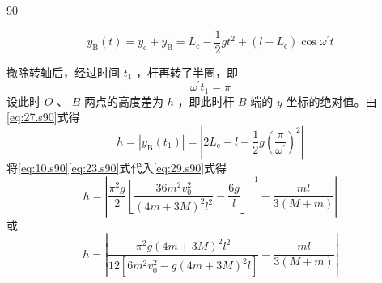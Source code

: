\begin{solution}{90}
\begin{subsolution}
\begin{equation}
\label{eq:26.s90}
\end{equation}
\begin{equation}
y _ {\mathrm{B}} (t) = y _ {\mathrm{c}} + y _ {\mathrm{B}} ^ {\prime} = L _ {\mathrm{c}} - \frac {1}{2} g t ^ {2} + \left(l - L _ {\mathrm{c}}\right) \cos \omega^ {\prime} t
\label{eq:27.s90}
\end{equation}
\end{subsolution}
\begin{subsolution}
撤除转轴后，经过时间 $t_{1}$ ，杆再转了半圈，即
\begin{equation}
\omega^ {\prime} t _ {1} = \pi
\label{eq:28.s90}
\end{equation}
设此时 $O$ 、 $B$ 两点的高度差为 $h$ ，即此时杆 $B$ 端的 $y$ 坐标的绝对值。由\eqref{eq:27.s90}式得
\begin{equation}
h = \left| y _ {\mathrm{B}} \left(t _ {1}\right) \right| = \left| 2 L _ {\mathrm{c}} - l - \frac {1}{2} g \left(\frac {\pi}{\omega^ {\prime}}\right) ^ {2} \right|
\label{eq:29.s90}
\end{equation}
将\eqref{eq:10.s90}\eqref{eq:23.s90}式代入\eqref{eq:29.s90}式得
\begin{equation}
h = \left| \frac {\pi^ {2} g}{2} \left[ \frac {3 6 m ^ {2} v _ {0} ^ {2}}{(4 m + 3 M) ^ {2} l ^ {2}} - \frac {6 g}{l} \right] ^ {- 1} - \frac {m l}{3 (M + m)} \right|
\label{eq:30.s90}
\end{equation}
或
\begin{equation}
h = \left| \frac {\pi^ {2} g (4 m + 3 M) ^ {2} l ^ {2}}{1 2 \left[ 6 m ^ {2} v _ {0} ^ {2} - g (4 m + 3 M) ^ {2} l \right]} - \frac {m l}{3 (M + m)} \right|
\label{eq:31.s90}
\end{equation}
\end{subsolution}
\end{solution}